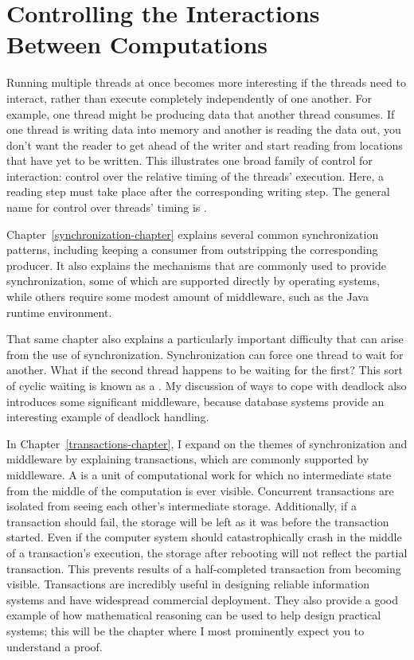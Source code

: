 \section{Controlling the Interactions Between
  Computations}\label{controlled-interaction-section}

Running multiple threads at once becomes more interesting if the
threads need to interact, rather than execute completely
independently of one another.  For example, one thread might be
producing data that another thread consumes.  If one thread is writing
data into memory and another is reading the data out, you don't want
the reader to get ahead of the writer and start reading from locations
that have yet to be written.  This illustrates one broad family of
control for interaction: control over the relative timing of the
threads' execution.  Here, a reading step must take place after the
corresponding writing step.  The general name for control over
threads' timing is .

Chapter~\ref{synchronization-chapter} explains several common
synchronization patterns, including keeping a consumer from
outstripping the corresponding producer.  It also explains the
mechanisms that are commonly used to provide synchronization, some of
which are supported directly by operating systems, while others
require some modest amount of middleware, such as the Java runtime
environment.

That same chapter also explains a particularly important difficulty
that can arise from the use of synchronization.  Synchronization can
force one thread to wait for another.  What if the second thread
happens to be waiting for the first?  This sort of cyclic waiting is
known as a .  My discussion of ways to cope with deadlock
also introduces some significant
middleware, because database systems provide an interesting example of
deadlock handling.

In Chapter~\ref{transactions-chapter}, I expand on the themes of
synchronization and middleware by explaining transactions, which are
commonly supported by middleware.  A  is a unit of
computational work for which no intermediate state from the middle of
the computation is ever visible.  Concurrent transactions are isolated
from seeing each other's intermediate storage.  Additionally, if a
transaction should fail, the storage will be left as it was before the
transaction started.
Even if the computer system should catastrophically crash in the middle of a transaction's execution, the storage after rebooting will not reflect the partial transaction.
This prevents results of a half-completed
transaction from becoming visible.  Transactions are incredibly useful
in designing reliable information systems and have widespread
commercial deployment.  They also provide a good example of how
mathematical reasoning can be used to help design practical systems;
this will be the chapter where I most prominently expect you to
understand a proof.

